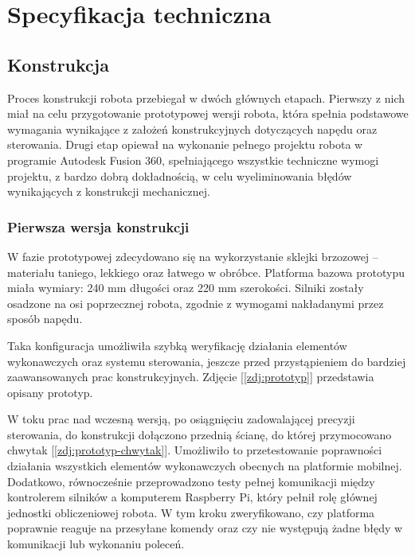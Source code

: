 \chapter{Specyfikacja techniczna}
\label{ch:06}

\section{Konstrukcja}
Proces konstrukcji robota przebiegał w dwóch głównych etapach. Pierwszy z nich miał na celu przygotowanie prototypowej wersji robota, która spełnia podstawowe wymagania wynikające z założeń konstrukcyjnych dotyczących napędu oraz sterowania. Drugi etap opiewał na wykonanie pełnego projektu robota w programie Autodesk Fusion 360, spełniającego wszystkie techniczne wymogi projektu, z bardzo dobrą dokładnością, w celu wyeliminowania błędów wynikających z konstrukcji mechanicznej.

\subsection{Pierwsza wersja konstrukcji}

W fazie prototypowej zdecydowano się na wykorzystanie sklejki brzozowej – materiału taniego, lekkiego oraz łatwego w obróbce. Platforma bazowa prototypu miała wymiary: 240 mm długości oraz 220 mm szerokości. Silniki zostały osadzone na osi poprzecznej robota, zgodnie z wymogami nakładanymi przez sposób napędu. 

Taka konfiguracja umożliwiła szybką weryfikację działania elementów wykonawczych oraz systemu sterowania, jeszcze przed przystąpieniem do bardziej zaawansowanych prac konstrukcyjnych. Zdjęcie [\ref{zdj:prototyp}] przedstawia opisany prototyp. 

\hspace{1cm}

W toku prac nad wczesną wersją, po osiągnięciu zadowalającej precyzji sterowania, do konstrukcji dołączono przednią ścianę, do której przymocowano chwytak [\ref{zdj:prototyp-chwytak}]. Umożliwiło to przetestowanie poprawności działania wszystkich elementów wykonawczych obecnych na platformie mobilnej. Dodatkowo, równocześnie przeprowadzono testy pełnej komunikacji między kontrolerem silników a komputerem Raspberry Pi, który pełnił rolę głównej jednostki obliczeniowej robota. W tym kroku zweryfikowano, czy platforma poprawnie reaguje na przesyłane komendy oraz czy nie występują żadne błędy w komunikacji lub wykonaniu poleceń.

